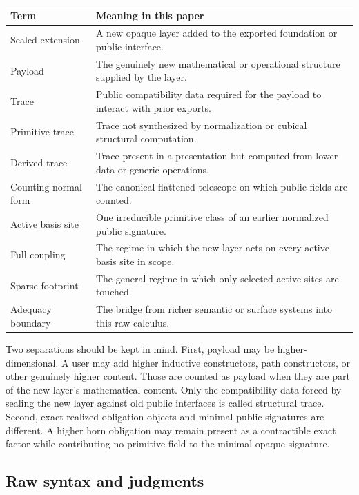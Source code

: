 \begin{center}
\begin{tabular}{ll}
\hline
Term & Meaning in this paper \\
\hline
Sealed extension & A new opaque layer added to the exported foundation or public interface. \\
Payload & The genuinely new mathematical or operational structure supplied by the layer. \\
Trace & Public compatibility data required for the payload to interact with prior exports. \\
Primitive trace & Trace not synthesized by normalization or cubical structural computation. \\
Derived trace & Trace present in a presentation but computed from lower data or generic operations. \\
Counting normal form & The canonical flattened telescope on which public fields are counted. \\
Active basis site & One irreducible primitive class of an earlier normalized public signature. \\
Full coupling & The regime in which the new layer acts on every active basis site in scope. \\
Sparse footprint & The general regime in which only selected active sites are touched. \\
Adequacy boundary & The bridge from richer semantic or surface systems into this raw calculus. \\
\hline
\end{tabular}
\end{center}

Two separations should be kept in mind.  First, payload may be higher-dimensional.  A user
may add higher inductive constructors, path constructors, or other genuinely higher content.
Those are counted as payload when they are part of the new layer's mathematical content.
Only the compatibility data forced by sealing the new layer against old public interfaces is
called structural trace.  Second, exact realized obligation objects and minimal public
signatures are different.  A higher horn obligation may remain present as a contractible exact
factor while contributing no primitive field to the minimal opaque signature.

\subsection{Raw syntax and judgments}

